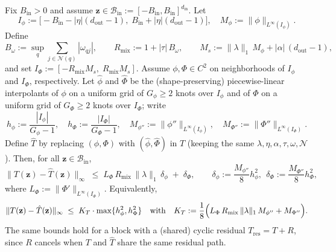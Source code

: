 \documentclass[10pt,a4paper]{amsart}
\begin{document}
\begin{lemma}\label{lem:single_block}
Fix $B_{\mathrm{in}}>0$ and assume $\mathbf{z}\in\mathcal{B}_{\mathrm{in}}:=[-B_{\mathrm{in}},B_{\mathrm{in}}]^{d_{\mathrm{in}}}$. Let
$$I_\phi := \bigl[-B_{\mathrm{in}}-|\eta|(d_{\mathrm{out}}-1),\; B_{\mathrm{in}}+|\eta|(d_{\mathrm{out}}-1)\bigr],
\quad
M_\phi := \|\phi\|_{L^\infty(I_\phi)}.$$
Define
$$B_\omega:=\sup_{q}\sum_{j\in\mathcal{N}(q)}|\omega_{qj}|,
\qquad
R_{\mathrm{mix}}:=1+|\tau|\,B_\omega,
\qquad
M_s := \|\lambda\|_{1}\,M_\phi + |\alpha|\,(d_{\mathrm{out}}-1),$$
and set $I_\Phi := [-R_{\mathrm{mix}}M_s,\; R_{\mathrm{mix}}M_s]$. Assume $\phi,\Phi\in C^2$ on neighborhoods of $I_\phi$ and $I_\Phi$, respectively. Let $\hat\phi$ and $\hat\Phi$ be the (shape-preserving) piecewise-linear interpolants of $\phi$ on a uniform grid of $G_\phi\ge 2$ knots over $I_\phi$ and of $\Phi$ on a uniform grid of $G_\Phi\ge 2$ knots over $I_\Phi$; write
$$h_\phi:=\frac{|I_\phi|}{G_\phi-1},\quad h_\Phi:=\frac{|I_\Phi|}{G_\Phi-1},\quad
M_{\phi''}:=\|\phi''\|_{L^\infty(I_\phi)},\quad M_{\Phi''}:=\|\Phi''\|_{L^\infty(I_\Phi)}.$$
Define $\hat T$ by replacing $(\phi,\Phi)$ with $(\hat\phi,\hat\Phi)$ in $T$ (keeping the same $\lambda,\eta,\alpha,\tau,\omega,\mathcal{N}$). Then, for all $\mathbf{z}\in\mathcal{B}_{\mathrm{in}}$,
\begin{equation}\label{eq:single_block_sup}
\|T(\mathbf{z})-\hat T(\mathbf{z})\|_\infty
\;\le\;
L_\Phi\,R_{\mathrm{mix}}\,\|\lambda\|_{1}\,\delta_\phi\;+\;\delta_\Phi,
\qquad
\delta_\phi:=\frac{M_{\phi''}}{8}h_\phi^2,\ \ \delta_\Phi:=\frac{M_{\Phi''}}{8}h_\Phi^2,
\end{equation}
where $L_\Phi:=\|\Phi'\|_{L^\infty(I_\Phi)}$. Equivalently,
$$\|T(\mathbf{z})-\hat T(\mathbf{z})\|_\infty
\;\le\;
K_T\cdot \max\{h_\phi^2,h_\Phi^2\}
\quad\text{with}\quad
K_T:=\frac{1}{8}\Bigl(L_\Phi\,R_{\mathrm{mix}}\,\|\lambda\|_{1}\,M_{\phi''}+M_{\Phi''}\Bigr).$$
The same bounds hold for a block with a (shared) cyclic residual $T_{\mathrm{res}}=T+R$, since $R$ cancels when $T$ and $\hat T$ share the same residual path.
\end{lemma}
\end{document}
